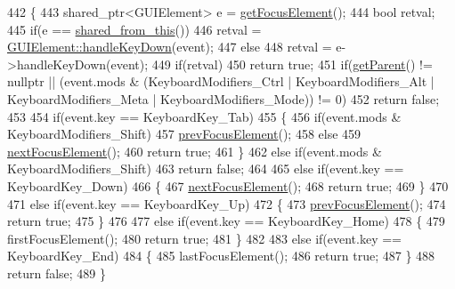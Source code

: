 \begin{DoxyCode}
442         \{
443             shared\_ptr<GUIElement> e = \hyperlink{classGUIContainer_addf987ba650075a7c0f34c571debd6a2}{getFocusElement}();
444             \textcolor{keywordtype}{bool} retval;
445             \textcolor{keywordflow}{if}(e == \hyperlink{classGUIElement_a5ad5998c5b953b6c6e32b583ddf9cd97}{shared\_from\_this}())
446                 retval = \hyperlink{classGUIElement_aa85f949aa746eac4deadfa0bb8827f71}{GUIElement::handleKeyDown}(event);
447             \textcolor{keywordflow}{else}
448                 retval = e->handleKeyDown(event);
449             \textcolor{keywordflow}{if}(retval)
450                 \textcolor{keywordflow}{return} \textcolor{keyword}{true};
451             \textcolor{keywordflow}{if}(\hyperlink{classGUIElement_aded5837705c097a7a8a755df28c572e6}{getParent}() != \textcolor{keyword}{nullptr} || (event.mods & (KeyboardModifiers\_Ctrl | 
      KeyboardModifiers\_Alt | KeyboardModifiers\_Meta | KeyboardModifiers\_Mode)) != 0)
452                 \textcolor{keywordflow}{return} \textcolor{keyword}{false};
453 
454             \textcolor{keywordflow}{if}(event.key == KeyboardKey\_Tab)
455             \{
456                 \textcolor{keywordflow}{if}(event.mods & KeyboardModifiers\_Shift)
457                     \hyperlink{classGUIContainer_afa186df2611c4e309094e8da2654f5b2}{prevFocusElement}();
458                 \textcolor{keywordflow}{else}
459                     \hyperlink{classGUIContainer_a83c20737ae89ecdb0da054cec1ca087e}{nextFocusElement}();
460                 \textcolor{keywordflow}{return} \textcolor{keyword}{true};
461             \}
462             \textcolor{keywordflow}{else} \textcolor{keywordflow}{if}(event.mods & KeyboardModifiers\_Shift)
463                 \textcolor{keywordflow}{return} \textcolor{keyword}{false};
464 
465             \textcolor{keywordflow}{else} \textcolor{keywordflow}{if}(event.key == KeyboardKey\_Down)
466             \{
467                 \hyperlink{classGUIContainer_a83c20737ae89ecdb0da054cec1ca087e}{nextFocusElement}();
468                 \textcolor{keywordflow}{return} \textcolor{keyword}{true};
469             \}
470 
471             \textcolor{keywordflow}{else} \textcolor{keywordflow}{if}(event.key == KeyboardKey\_Up)
472             \{
473                 \hyperlink{classGUIContainer_afa186df2611c4e309094e8da2654f5b2}{prevFocusElement}();
474                 \textcolor{keywordflow}{return} \textcolor{keyword}{true};
475             \}
476 
477             \textcolor{keywordflow}{else} \textcolor{keywordflow}{if}(event.key == KeyboardKey\_Home)
478             \{
479                 firstFocusElement();
480                 \textcolor{keywordflow}{return} \textcolor{keyword}{true};
481             \}
482 
483             \textcolor{keywordflow}{else} \textcolor{keywordflow}{if}(event.key == KeyboardKey\_End)
484             \{
485                 lastFocusElement();
486                 \textcolor{keywordflow}{return} \textcolor{keyword}{true};
487             \}
488             \textcolor{keywordflow}{return} \textcolor{keyword}{false};
489         \}
\end{DoxyCode}
